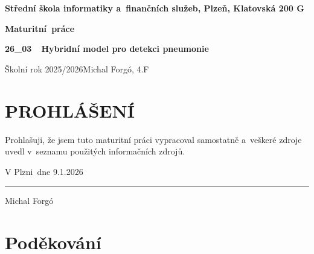 \documentclass[12pt, a4paper]{report}
\newcommand{\nazevPrace}{Hybridní model pro detekci pneumonie} %
\newcommand{\typPrace}{Maturitní~práce} %
\newcommand{\kodPrace}{26\_03} %
\newcommand{\autor}{Michal Forgó} %
\newcommand{\trida}{4.F} %
\newcommand{\skola}{Střední škola informatiky a~finančních služeb, Plzeň, Klatovská 200 G} %
\newcommand{\skolniRok}{2025/2026} %
\newcommand{\datum}{9.1.2026} %
\newcommand{\misto}{V Plzni} %
\begin{document}
\begin{titlepage}
    \begin{center}
        \Huge \textbf{\skola} \\
        \vspace{5cm} %

        \Huge \textbf{\typPrace} \\ 
        \vspace{2cm} %
        
        \Huge \textbf{\kodPrace \ \ \nazevPrace} \\ 
        
    \end{center}

    \vfill %

    \noindent
    \Large
    Školní rok \skolniRok \hfill \autor, \trida 
\end{titlepage}

\newpage
\thispagestyle{empty}
\section*{PROHLÁŠENÍ} %

Prohlašuji, že jsem tuto maturitní práci vypracoval samostatně a~veškeré zdroje uvedl v~seznamu použitých informačních zdrojů. %

\vspace{2cm}

\noindent
\begin{minipage}{0.45\textwidth}
    \misto \ dne \datum \\ %
    \vspace{1.5cm}
    \hrule
    \vspace{0.2cm}
    \centering \autor %
\end{minipage}

\newpage
\thispagestyle{empty}
\section*{Poděkování}
\end{document}
